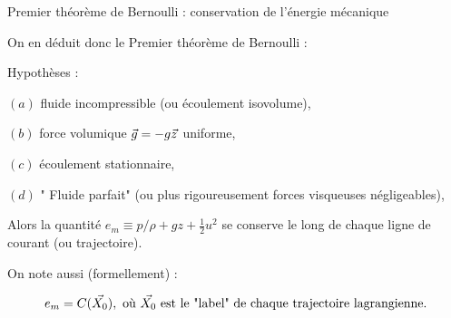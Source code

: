\begin{frame}{Premier théorème de Bernoulli : conservation de l'énergie mécanique}

\small

On en déduit donc le \textcolor{vert}{Premier théorème de Bernoulli} :
\medskip

Hypothèses : 

$(a)$ fluide incompressible (ou écoulement isovolume),

$(b)$ force volumique $\vec{g} = - g \vec{z} $ uniforme,

$(c)$ écoulement stationnaire,

$(d)$ " Fluide parfait" (ou plus rigoureusement forces visqueuses négligeables),

\smallskip

Alors la quantité 
$ e_m \equiv p/\rho  + g z + \frac{1}{2}  u^2$ se conserve le long de chaque ligne de courant (ou trajectoire).

\medskip
\pause

On note aussi (formellement) : 

$$ 
e_m = C(\vec{X_0}), \mbox{ où } \vec{X_0} \mbox{ est le "label" de chaque trajectoire lagrangienne.}
$$



\bigskip \pause



\end{frame}
